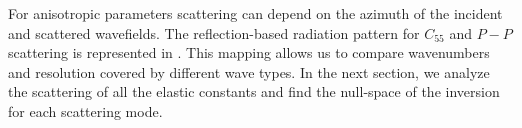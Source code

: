 
For anisotropic parameters scattering can depend on the azimuth of the incident and scattered wavefields. The reflection-based radiation pattern for $C_{55}$ and $P-P$ scattering is represented in .
%
This mapping allows us to compare wavenumbers and resolution covered by different wave types.
%
In the next section, we analyze the scattering of all the elastic 
constants and find the null-space of the inversion for each scattering mode.